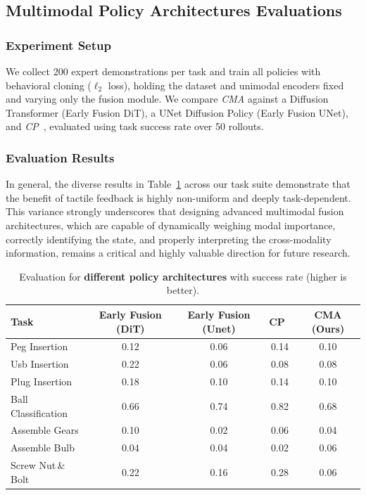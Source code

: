 \documentclass{article}
\begin{document}
\subsection{Multimodal Policy Architectures Evaluations}

\subsubsection{Experiment Setup}
We collect 200 expert demonstrations per task and train all policies with behavioral cloning ($\ell_2$ loss), holding the dataset and unimodal encoders fixed and varying only the fusion module. We compare \emph{CMA} against a Diffusion Transformer (Early Fusion DiT), a UNet Diffusion Policy (Early Fusion UNet), and \emph{CP}~\citep{chen2025consensus}, evaluated using task success rate over 50 rollouts.

\subsubsection{Evaluation Results}

In general, the diverse results in Table~\ref{tab:fusion-architecture} across our task suite demonstrate that the benefit of tactile feedback is highly non-uniform and deeply task-dependent. This variance strongly underscores that designing advanced multimodal fusion architectures, which are capable of dynamically weighing modal importance, correctly identifying the state, and properly interpreting the cross-modality information, remains a critical and highly valuable direction for future research.

\vspace{-1em}
\begin{table}[h]
    \centering
    \caption{\small Evaluation for \textbf{different policy architectures} with success rate (higher is better). }
    \vspace{0.5em}
    \begin{tabular}{lcccc}
        \hline
        \textbf{Task} & \textbf{Early Fusion (DiT)} & \textbf{Early Fusion (Unet)} & \textbf{CP~\citep{chen2025consensus}} & \textbf{CMA (Ours)} \\
        \hline
        Peg Insertion   & 0.12 & 0.06 & 0.14 & 0.10 \\
        Usb Insertion      & 0.22 & 0.06 & 0.08 & 0.08 \\
        Plug Insertion                    & 0.18 & 0.10 & 0.14 & 0.10 \\
        Ball Classification                  & 0.66 & 0.74 & 0.82 & 0.68 \\
        Assemble Gears      & 0.10 & 0.02 & 0.06 & 0.04 \\
        Assemble Bulb        & 0.04 & 0.04 & 0.02 & 0.06 \\
        Screw Nut\,\&\,Bolt  & 0.22 & 0.16 & 0.28 & 0.06 \\
        \hline
    \end{tabular}
    \label{tab:fusion-architecture}
\end{table}
\end{document}
